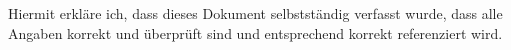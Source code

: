 
Hiermit erkläre ich, dass dieses Dokument selbstständig verfasst wurde, dass alle Angaben korrekt
und überprüft sind und entsprechend korrekt referenziert wird.
\vSpaceStyle{}
\gitAuthorDate~\gitAuthorName